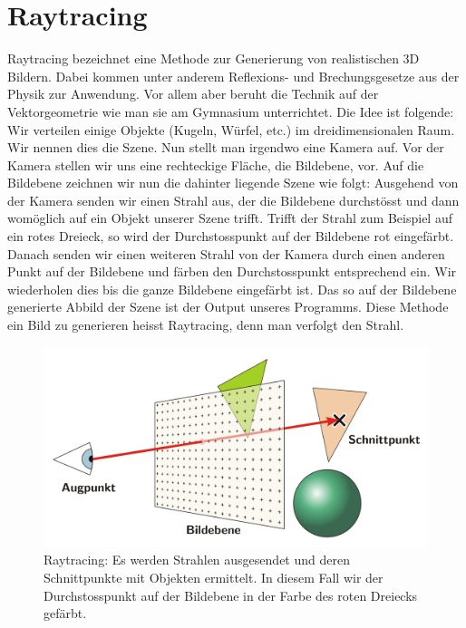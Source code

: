 \section{Raytracing}
Raytracing bezeichnet eine Methode zur Generierung von realistischen 3D Bildern.
Dabei kommen unter anderem Reflexions- und Brechungsgesetze aus der Physik zur Anwendung.
Vor allem aber beruht die Technik auf der Vektorgeometrie wie man sie am Gymnasium unterrichtet.
Die Idee ist folgende: Wir verteilen einige Objekte (Kugeln, Würfel, etc.) im dreidimensionalen Raum.
Wir nennen dies die Szene.
Nun stellt man irgendwo eine Kamera auf.
Vor der Kamera stellen wir uns eine rechteckige Fläche, die Bildebene, vor.
Auf die Bildebene zeichnen wir nun die dahinter liegende Szene wie folgt:
Ausgehend von der Kamera senden wir einen Strahl aus, der die Bildebene durchstösst und dann womöglich auf ein Objekt unserer Szene trifft.
Trifft der Strahl zum Beispiel auf ein rotes Dreieck, so wird der Durchstosspunkt auf der Bildebene rot eingefärbt.
Danach senden wir einen weiteren Strahl von der Kamera durch einen anderen Punkt auf der Bildebene und färben den Durchstosspunkt entsprechend ein.
Wir wiederholen dies bis die ganze Bildebene eingefärbt ist.
Das so auf der Bildebene generierte Abbild der Szene ist der Output unseres Programms.
Diese Methode ein Bild zu generieren heisst Raytracing, denn man verfolgt den Strahl.
\begin{figure}[h!]
	\centering
	\includegraphics[width=\textwidth]{images/raytracing.png}
	\caption{Raytracing: Es werden Strahlen ausgesendet und deren Schnittpunkte mit Objekten ermittelt. In diesem Fall wir der Durchstosspunkt auf der Bildebene in der Farbe des roten Dreiecks gefärbt.}
	\label{fig:raytracing}
\end{figure}
